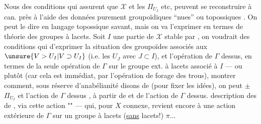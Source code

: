 Nous  des conditions qui assurent que $\mathcal{X}$ et les $\Pi_{U_I}$  etc, peuvent se reconstruire à   can. près à l'aide des données purement groupoïdiques ``nues'' ou topossiques  .  On peut le dire en langage topossique savant, mais on va l'exprimer en termes de théorie des groupes à lacets. Soit $I$ une partie de $\mathcal{X}$ stable par , on voudrait  des conditions qui   d'exprimer  la situation des groupoïdes  associés aux $\unsure{V>U_I|V\supset U_I}$ (i.e. les $U_J$ avec $J\subset I$),  et l'opération de $\Gamma$ dessus, en termes de la  seule opération de $\Gamma$ sur le groupe ext. à lacets   associé à $I$ ---
\margin{\unsure{$\rightsquigarrow$|$\longrightarrow$}}
ou plutôt (car cela est immédiat, par l'opération de forage des trous),  montrer comment,
sous réserve d'anabélianité \unsure{$\zeta$|$\xi$} disons de  (pour fixer les idées), on peut $\pm$  $\Pi_{U_I}$ et l'action de $\Gamma$ dessus ,
à partir de   et de l'action de $\Gamma$ dessus.
 description  des  de ,  via
cette action "" --- qui, pour $X$ connexe, revient encore à une action extérieure de $\Gamma$ sur un groupe à lacets (\uline{sans} lacets!) $\pi$...

